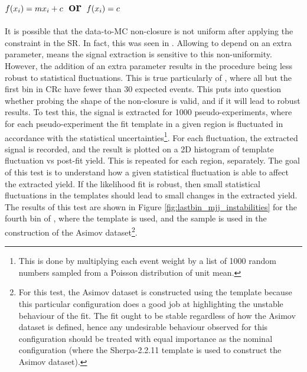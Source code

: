 \subsection{$f(x_i)=mx_i+c$ or $f(x_i)=c$}\label{sec:vbswy:fitinstab}

It is possible that the data-to-MC non-closure is not uniform after applying the \bl constraint in the SR. In fact, this was seen in \cite{VBSWy:VBFZ}. Allowing \fx to depend on an extra parameter, means the signal extraction is sensitive to this non-uniformity. However, the addition of an extra parameter results in the procedure being less robust to statistical fluctuations. This is true particularly of \mjj, where all but the first bin in CRc have fewer than 30 expected events. This puts into question whether probing the shape of the non-closure is valid, and if it will lead to robust results. To test this, the signal is extracted for 1000 pseudo-experiments, where for each pseudo-experiment the \qcdwy fit template in a given region is fluctuated in accordance with the statistical uncertainties\footnote{This is done by multiplying each event weight by a list of 1000 random numbers sampled from a Poisson distribution of unit mean.}. For each fluctuation, the extracted signal is recorded, and the result is plotted on a 2D histogram of \qcdwy template fluctuation vs post-fit \ewwy yield. This is repeated for each region, separately. The goal of this test is to understand how a given statistical fluctuation is able to affect the extracted \ewwy yield. If the likelihood fit is robust, then small statistical fluctuations in the templates should lead to small changes in the extracted \ewwy yield. The results of this test are shown in Figure \ref{fig:lastbin_mjj_instabilities} for the fourth bin of \mjj, where the \MADGRAPH \qcdwy template is used, and the \MADGRAPH \qcdwy sample is used in the construction of the Asimov dataset\footnote{For this test, the Asimov dataset is constructed using the \MADGRAPH \qcdwy template because this particular configuration does a good job at highlighting the unstable behaviour of the fit. The fit ought to be stable regardless of how the Asimov dataset is defined, hence any undesirable behaviour observed for this configuration should be treated with equal importance as the nominal configuration (where the Sherpa-2.2.11 \qcdwy template is used to construct the Asimov dataset).}.

